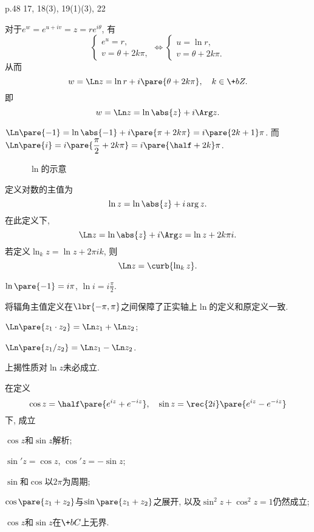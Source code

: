 \documentclass[../ComplexVariable.tex]{subfiles}
\begin{document}
p.48 17, 18(3), 19(1)(3), 22


对于$e^w = e^{u+iv} = z = re^{i\theta}$, 有
\[ \begin{cases}
    e^u = r,\\
    v = \theta + 2k\pi,
\end{cases}\Leftrightarrow \begin{cases}
    u = \ln r,\\
    v = \theta + 2k\pi.
\end{cases} \]
从而
\[ w = \Ln z = \ln r + i\pare{\theta+2k\pi},\quad k\in\+bZ. \]
即
\[ w = \Ln z = \ln\abs{z} + i\Arg z. \]
\begin{sample}
    \begin{ex}
        $\Ln \pare{-1} = \ln \abs{-1} + i\pare{\pi + 2k\pi} = i\pare{2k+1}\pi$. 而$\Ln \pare{i} = i\pare{\displaystyle \frac{\pi}{2} + 2k\pi} = i\pare{\displaystyle \half + 2k}\pi$.
    \end{ex}
\end{sample}
\begin{figure}[ht]
    \centering
    \caption{$\ln$的示意}
    \label{fig:ln的示意}
\end{figure}
定义对数的主值为
\[ \ln z = \ln \abs{z} + i\arg z. \]
在此定义下,
\[ \Ln z = \ln\abs{z} + i\Arg z = \ln z + 2k\pi i. \]
若定义$\ln_k z = \ln z + 2\pi i k$, 则
\[ \Ln z  = \curb{\ln_k z}. \]
\begin{sample}
    \begin{ex}
        $\ln\pare{-1} = i\pi$, $\ln i = i\displaystyle\frac{\pi}{2}$.
    \end{ex}
\end{sample}
\begin{remark}
    将辐角主值定义在$\lbr{-\pi,\pi}$之间保障了正实轴上$\ln$的定义和原定义一致.
\end{remark}
\begin{proposition}[$\Ln$的古典性质]
    \mbox{}
    \begin{cenum}
        \item $\Ln \pare{z_1\cdot z_2} = \Ln z_1 + \Ln z_2$;
        \item $\Ln \pare{z_1/z_2} = \Ln z_1 - \Ln z_2$.
    \end{cenum}
\end{proposition}
\begin{pitfall}
    上揭性质对$\ln z$未必成立.
\end{pitfall}
在定义
\[ \cos z = \half \pare{e^{iz} + e^{-iz}}, \quad \sin z = \rec{2i}\pare{e^{iz} - e^{-iz}} \]
下, 成立
\begin{cenum}
    \item $\cos z$和$\sin z$解析;
    \item $\sin' z = \cos z$, $\cos' z = -\sin z$;
    \item $\sin$和$\cos$以$2\pi$为周期;
    \item $\cos \pare{z_1+z_2}$与$\sin \pare{z_1+z_2}$之展开, 以及$\sin^2 z + \cos^2 z = 1$仍然成立;
    \item $\cos z$和$\sin z$在$\+bC$上无界.
\end{cenum}
\end{document}
